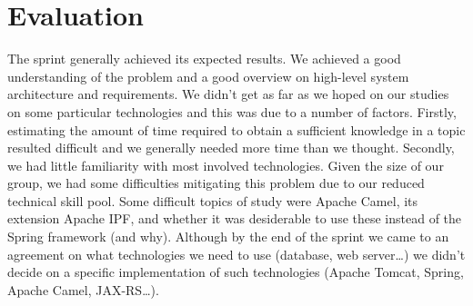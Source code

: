 
\section{Evaluation}

The sprint generally achieved its expected results.
We achieved a good understanding of the problem and a good overview on high-level system architecture
and requirements. We didn't get as far as we hoped on our studies on some particular technologies and this was
due to a number of factors. Firstly, estimating the amount of time required to obtain a sufficient knowledge
in a topic resulted difficult and we generally needed more time than we thought.
Secondly, we had little familiarity with most involved technologies.
Given the size of our group, we had some difficulties mitigating this problem due to
our reduced technical skill pool. Some difficult topics of study were Apache Camel, its extension Apache IPF,
and whether it was desiderable to use these instead of the Spring framework (and why).
Although by the end of the sprint we came to an agreement on what technologies we need to use
(database, web server\ldots) we didn't decide on a specific implementation of such technologies
(Apache Tomcat, Spring, Apache Camel, JAX-RS\ldots).

